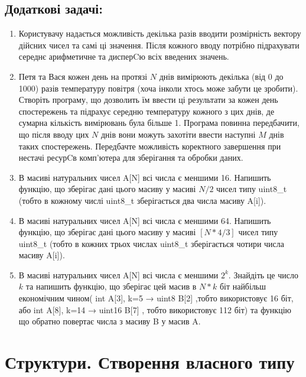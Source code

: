 \documentclass[a5paper,titlepage,openany,twoside,draft]{book_unv}%
\begin{document}
\section{Додаткові задачі:}

\begin{enumerate}
\def\labelenumi{\arabic{enumi})}
\setcounter{enumi}{8}
\item
  Користувачу надається можливість декілька разів вводити розмірність
  вектору дійсних чисел та самі ці значення. Після кожного вводу
  потрібно підрахувати середнє арифметичне та дисперCю всіх введених
  значень.
\item
  Петя та Вася кожен день на протязі $N$ днів вимірюють
  декілька (від 0 до 1000) разів температуру повітря (хоча інколи хтось
  може забути це зробити). Створіть програму, що дозволить їм ввести ці
  результати за кожен день спостережень та підрахує середню температуру
  кожного з цих днів, де сумарна кількість вимірювань була більше 1.
  Програма повинна передбачити, що після вводу цих $N$ днів вони можуть
  захотіти ввести наступні $M$ днів таких спостережень. Передбачте
  можливість коректного завершення при нестачі ресурCв комп'ютера для
  зберігання та обробки даних.
\item
 В масиві натуральних чисел A{[}N{]} всі числа є меншими 16. Напишить
  функцію, що зберігає дані цього масиву у масиві $N/2$ чисел типу
  uint8\_t (тобто в кожному числі uint8\_t зберігається два числа масиву
  A{[}i{]}).
\item
  В масиві натуральних чисел A{[}N{]} всі числа є меншими 64. Напишить
  функцію, що зберігає дані цього масиву у масиві $[N*4/3]$ чисел типу
  uint8\_t (тобто в кожних трьох числах uint8\_t зберігається чотири
  числа масиву A{[}i{]}).
\item
  В масиві натуральних чисел A{[}N{]} всі числа є меншими \(2^{k}\).
  Знайдіть це число $k$ та напишить функцію, що зберігає цей масив в $N*k$
  біт найбільш економічним чином( int A{[}3{]}, k=5 → uint8 B{[}2{]}
  ,тобто використовує 16 біт, або int A{[}8{]}, k=14 → uint16 B{[}7{]} ,
  тобто використовує 112 біт) та функцію що обратно повертає числа з
  масиву B у масив A.
\end{enumerate}



\chapter{Структури. Створення власного типу}
%
\end{document}
